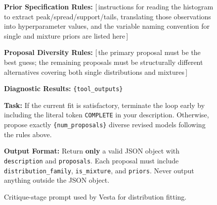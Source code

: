 \documentclass{article}
\newcommand{\method}{{\sc Vesta}}
\begin{document}
\begin{figure}[h]
\begin{mdframed}[linecolor=gray!50, backgroundcolor=gray!5, linewidth=0.8pt]
\medskip
\textbf{Prior Specification Rules:} [\,instructions for reading the
histogram to extract peak/spread/support/tails, translating those
observations into hyperparameter values, and the variable naming convention
for single and mixture priors are listed here\,]

\medskip
\textbf{Proposal Diversity Rules:} [\,the primary proposal must be the best
guess; the remaining proposals must be structurally different alternatives
covering both single distributions and mixtures\,]

\medskip
\textbf{Diagnostic Results:} \texttt{\{tool\_outputs\}}

\medskip
\textbf{Task:} If the current fit is satisfactory, terminate the loop early
by including the literal token \texttt{COMPLETE} in your description.
Otherwise, propose exactly \texttt{\{num\_proposals\}} diverse revised
models following the rules above.

\medskip
\textbf{Output Format:} Return \textbf{only} a valid JSON object with
\texttt{description} and \texttt{proposals}. Each proposal must include
\texttt{distribution\_family}, \texttt{is\_mixture}, and \texttt{priors}.
Never output anything outside the JSON object.

\end{mdframed}
\caption{Critique-stage prompt used by \method{} for distribution fitting.}
\label{fig:dist-proposal-prompt}
\end{figure}
\end{document}
